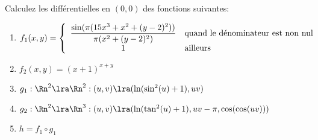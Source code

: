 
\begin{exercice}\label{exo0051}

Calculez les différentielles en  $(0,0)$ des fonctions suivantes:

\begin{enumerate}
\item $f_1(x,y)=\left\{\begin{array}{cl}
                        \dfrac{\sin(\pi(15x^3+x^2+(y-2)^2))}{\pi(x^2+(y-2)^2)} & {\rm quand \ le \ d\acute{e}nominateur \ est \ non \ nul}  \\
                        1             						    & {\rm ailleurs}
                        
                        \end{array}\right.$
\item $f_2(x,y)= (x+1)^{x+y}$
\item $g_1:\Rn^2\lra\Rn^2:(u,v)\lra(\ln(\sin^2(u)+1),uv)$
\item $g_2:\Rn^2\lra\Rn^3:(u,v)\lra(\ln(\tan^2(u)+1),uv-\pi, \cos(\cos(uv)))$
\item $h=f_1\circ g_1$
\end{enumerate}

\end{exercice}
